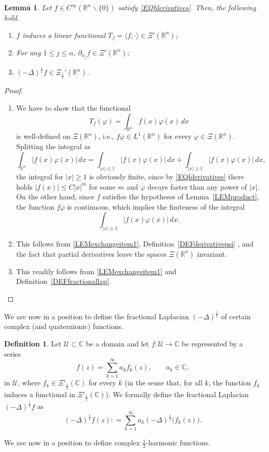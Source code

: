 \documentclass[reqno,11pt]{amsart}
\newtheorem{lemma}[theorem]{Lemma}
\theoremstyle{definition}
\newtheorem{definition}[theorem]{Definition}
\def\R{\mathbb{R}}
\begin{document}
\begin{lemma}
	\label{exchange}
	Let $f\in C^\infty(\R^n\backslash\{0\})$ satisfy \eqref{EQfderivatives}. Then, the following hold.
	\begin{enumerate}[label=\textnormal{(\roman{*})}]
		\item $f$ induces a linear functional $T_f=\langle f,\cdot\rangle\in \Xi'(\R^n)$; \label{LEMexchangeitem1}
		\item For any $1\leq j\leq n$, $ \partial_{x_j}f\in \Xi'(\R^n) $;
		\item $(-\Delta)^{\frac{1}{2}}f\in \Xi_\frac{1}{2}'(\R^n)$.
	\end{enumerate}
\end{lemma}
\begin{proof}
	\begin{enumerate}[wide,label=\textnormal{(\roman{*})}]
		\item We have to show that the functional
		\[
		T_f(\varphi)=\int_{\mathbb{R}^n} f(x)\varphi(x)\,dx
		\]
		is well-defined on $\Xi(\mathbb{R}^n)$, i.e., $f\varphi \in L^1(\mathbb{R}^n)$ for every $\varphi \in \Xi(\mathbb{R}^n)$. Splitting the integral as
		\[
		\int_{\mathbb{R}^n} |f(x)\varphi(x)|\,dx =  \int_{|x|\leq  1} |f(x)\varphi(x)|\,dx +\int_{|x|\ge 1} |f(x)\varphi(x)|\,dx,
		\]
		the integral for $|x|\geq1 $ is obviously finite, since by \eqref{EQfderivatives} there holds $|f(x)|\leq C|x|^{m}$ for some $m$ and  $\varphi$ decays faster than any power of $|x|$. On the other hand, since $f$ satisfies the hypotheses of Lemma~\ref{LEMproduct}, the function $f\varphi$ is continuous, which implies the finiteness of the integral
		\[
		\int_{|x|\leq  1} |f(x)\varphi(x)|\,dx.
		\]

		\item This follows from \ref{LEMexchangeitem1}, Definition~\ref{DEFderivativepsi} , and the fact that partial derivatives leave the spaces $\Xi(\R^n)$ invariant.
		\item This readily follows from  \ref{LEMexchangeitem1} and  Definition~\ref{DEFfractionallap}. \qedhere
	\end{enumerate}
\end{proof}

We are now in a position to define the fractional Laplacian $(-\Delta)^\frac{1}{2}$ of certain complex (and quaternionic) functions.
\begin{definition}\label{DEFlaplacecomplex}
Let $\mathcal{U}\subset \mathbb{C}$ be a domain and let $f:\mathcal{U}\to \mathbb{C}$ be represented by a series
\[
f(z) = \sum_{k=1}^\infty a_{k} f_{k}(z) , \qquad a_{k}\in \mathbb{C},
\]
in $\mathcal{U}$, where $f_k\in \Xi'_{\frac{1}{2}}(\mathbb{C})$ for every $k$ (in the sense that, for all $k$, the function $f_k$ induces a functional in $ \Xi'_{\frac{1}{2}}(\mathbb{C})$). We formally define the fractional Laplacian $(-\Delta)^\frac{1}{2}f$ as
\begin{equation}
	\label{EQdeflapcomplex}
(-\Delta)^\frac{1}{2}f(z): = \sum_{k=1}^\infty a_{k}(-\Delta)^\frac{1}{2}\big(f_{k}(z)\big) .
\end{equation}
\end{definition}
We are now in a position to define complex $\frac{1}{2}$-harmonic functions.
\end{document}
